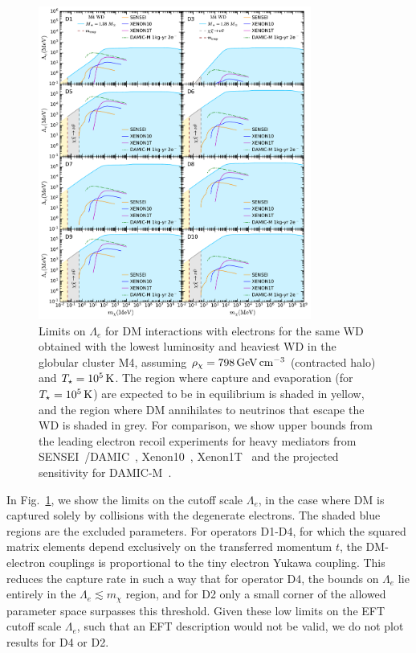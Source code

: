\begin{figure}[t!bp]
    \centering
    \includegraphics[width=0.8\textwidth]{wd_capture/Lambda_mdm_e_limits.pdf}
    \caption[Limits on $\Lambda_e$ for DM interactions with electrons for the WD with the lowest luminosity and heaviest WD in the globular cluster M4, assuming $\rho_\chi=798\GeV\cm^{-3}$ (contracted halo) \cite{McCullough:2010ai_CaptureInelasticDark} and $\Tstar=10^5\K$.]{Limits on $\Lambda_e$ for DM interactions with electrons for the same WD obtained with the lowest luminosity and heaviest WD in the globular cluster M4, assuming $\rho_\chi=798\GeV\cm^{-3}$ (contracted halo) \cite{McCullough:2010ai_CaptureInelasticDark} and $\Tstar=10^5\K$. The region where capture and evaporation (for $\Tstar=10^5\K$) are expected to be in equilibrium is shaded in yellow, and the region where DM annihilates to neutrinos that escape the WD is shaded in grey. For comparison, we show upper bounds from the leading electron recoil experiments for heavy mediators from SENSEI~\cite{SENSEI:2020dpa_SENSEIDirectdetectionresults}/DAMIC~\cite{DAMIC:2019dcn_Constraintslightdark}, Xenon10~\cite{Essig:2017kqs_Newconstraintsprospects}, Xenon1T~\cite{XENON:2019gfn_Lightdarkmatter} and the projected sensitivity for DAMIC-M~\cite{Essig:2015cda_DirectdetectionsubGeV}. }
    \label{ch4:fig:Llimitse}
\end{figure}


In Fig.~\ref{ch4:fig:Llimitse}, we show the limits on the cutoff scale $\Lambda_e$, in the case where DM is captured solely by collisions with the degenerate electrons. The shaded blue regions are the excluded parameters.
For operators D1-D4, for which the squared matrix elements
depend exclusively on the transferred momentum $t$, the DM-electron couplings is proportional to the tiny electron Yukawa coupling. 
This reduces the capture rate in such a way that for operator D4, the bounds on $\Lambda_e$ lie entirely in the $\Lambda_e \lesssim m_\chi$ region, and for D2 only a small corner of the allowed parameter space surpasses this threshold. Given these low limits on the EFT cutoff scale $\Lambda_e$, such that an EFT description would not be valid, we do not plot results for D4 or D2.


